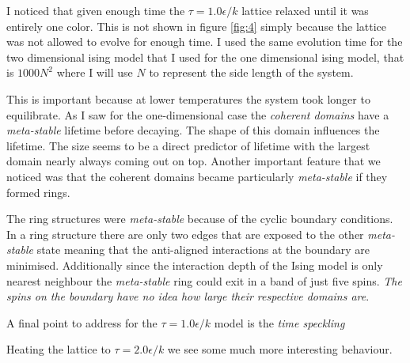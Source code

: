 \documentclass[a4paper, twocolumn]{article}
\begin{document}
I noticed that given enough time the \(\tau = 1.0 \epsilon / k\) lattice %
relaxed until it was entirely one color. This is not shown in figure %
\ref{fig:4} simply because the lattice was not allowed to evolve %
for enough time. I used the same evolution time for the two %
dimensional ising model that I used for the one dimensional %
ising model, that is \(1000N^{2}\) where I will use \(N\) to %
represent the side length of the system. 


This is important because at lower temperatures the system took longer %
to equilibrate. As I saw for the one-dimensional case the %
\emph{coherent domains} have a \emph{meta-stable} lifetime before decaying. %
The shape of this domain influences the lifetime. The size %
seems to be a direct predictor of lifetime with the largest %
domain nearly always coming out on top. Another important %
feature that we noticed was that the coherent domains became %
particularly \emph{meta-stable} if they formed rings. 


The ring structures were \emph{meta-stable} because of the cyclic %
boundary conditions. In a ring structure there are only two edges %
that are exposed to the other \emph{meta-stable} state meaning %
that the anti-aligned interactions at the boundary are minimised. %
Additionally since the interaction depth of the Ising model is %
only nearest neighbour the \emph{meta-stable} ring could exit %
in a band of just five spins. \emph{The spins on the boundary %
have no idea how large their respective domains are}.


A final point to address for the \(\tau = 1.0\epsilon / k\) model %
is the \emph{time speckling} 


Heating the lattice to \(\tau = 2.0 \epsilon / k\) we see some %
much more interesting behaviour. 
        
\end{document}
